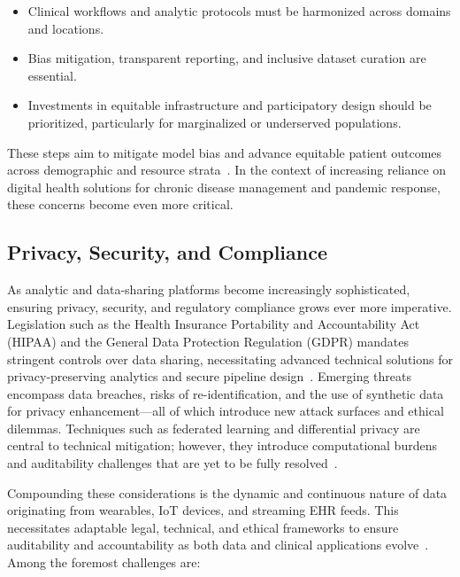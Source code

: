 \documentclass[sigconf]{acmart}
\begin{document}
\begin{itemize}
    \item Clinical workflows and analytic protocols must be harmonized across domains and locations.
    \item Bias mitigation, transparent reporting, and inclusive dataset curation are essential.
    \item Investments in equitable infrastructure and participatory design should be prioritized, particularly for marginalized or underserved populations.
\end{itemize}

These steps aim to mitigate model bias and advance equitable patient outcomes across demographic and resource strata~\cite{ref44,ref45,ref50,ref55,ref60,ref61,ref64,ref65,ref66,ref67,ref74,ref75,ref78,ref79,ref80,ref84,ref90,ref106}. In the context of increasing reliance on digital health solutions for chronic disease management and pandemic response, these concerns become even more critical.

\subsection{Privacy, Security, and Compliance}

As analytic and data-sharing platforms become increasingly sophisticated, ensuring privacy, security, and regulatory compliance grows ever more imperative. Legislation such as the Health Insurance Portability and Accountability Act (HIPAA) and the General Data Protection Regulation (GDPR) mandates stringent controls over data sharing, necessitating advanced technical solutions for privacy-preserving analytics and secure pipeline design~\cite{ref2, ref4, ref5, ref6, ref7, ref8, ref9, ref10, ref24, ref25, ref28, ref30, ref31, ref33, ref34, ref35, ref36, ref41, ref43, ref46, ref50, ref54, ref51, ref61, ref62, ref63, ref64, ref65, ref70, ref71, ref72, ref75, ref76, ref77, ref78, ref79, ref82, ref83, ref84, ref90, ref91, ref106}. Emerging threats encompass data breaches, risks of re-identification, and the use of synthetic data for privacy enhancement—all of which introduce new attack surfaces and ethical dilemmas. Techniques such as federated learning and differential privacy are central to technical mitigation; however, they introduce computational burdens and auditability challenges that are yet to be fully resolved~\cite{ref5, ref6, ref7, ref54, ref65, ref71, ref72, ref75, ref77, ref78, ref79, ref84, ref90, ref91, ref106}.

Compounding these considerations is the dynamic and continuous nature of data originating from wearables, IoT devices, and streaming EHR feeds. This necessitates adaptable legal, technical, and ethical frameworks to ensure auditability and accountability as both data and clinical applications evolve~\cite{ref51, ref56, ref61, ref63, ref65, ref70, ref72, ref75, ref76, ref78, ref82, ref84, ref90, ref91, ref106}. Among the foremost challenges are:
\end{document}
